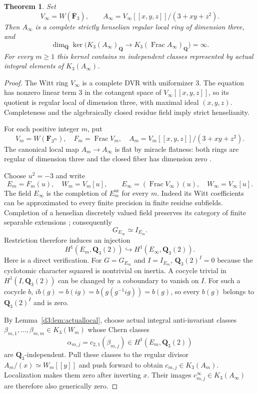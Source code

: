 \documentclass[11pt,a4paper]{amsart}
\numberwithin{equation}{section}
\newtheorem{theorem}{Theorem}[section]
\theoremstyle{definition}
\theoremstyle{remark}
\newcommand{\Q}{\mathbf Q}
\newcommand{\Frac}{\operatorname{Frac}}
\begin{document}
\begin{theorem}
\label{d3:thm:stricthenselianinfinite}
Set
\[
 V_\infty=W(\overline{\mathbf F}_3),\qquad
 A_\infty=V_\infty[[x,y,z]]/(3+xy+z^2).
\]
Then $A_\infty$ is a complete strictly henselian regular local ring of
dimension three, and
\[
 \dim_{\Q}\ker\bigl(
   K_3(A_\infty)_{\Q}
       \longrightarrow K_3(\Frac A_\infty)_{\Q}\bigr)=\infty.
\]
For every $m\geq1$ this kernel contains $m$ independent classes
represented by actual integral elements of $K_3(A_\infty)$.
\end{theorem}
\begin{proof}
The Witt ring $V_\infty$ is a complete DVR with uniformizer $3$.
The equation has nonzero linear term $3$ in the cotangent space of
$V_\infty[[x,y,z]]$, so its quotient is regular local of dimension three,
with maximal ideal $(x,y,z)$. Completeness and the algebraically closed
residue field imply strict henselianity.

For each positive integer $m$, put
\[
 V_m=W(\mathbf F_{3^m}),\quad F_m=\Frac V_m,\quad
 A_m=V_m[[x,y,z]]/(3+xy+z^2).
\]
The canonical local map $A_m\to A_\infty$ is flat by miracle flatness:
both rings are regular of dimension three and the closed fiber has
dimension zero \cite[Tag~00R4]{StacksFlatness}.

Choose $u^2=-3$ and write
\[
 E_m=F_m(u),\quad W_m=V_m[u],\qquad
 E_\infty=(\Frac V_\infty)(u),\quad W_\infty=V_\infty[u].
\]
The field $E_\infty$ is the completion of $E_m^{\mathrm{ur}}$ for every
$m$. Indeed its Witt coefficients can be approximated to every finite
precision in finite residue subfields. Completion of a henselian
discretely valued field preserves its category of finite separable
extensions \cite[Lemma~4.2.1]{SaitoCompletion}; consequently
\[
 G_{E_\infty}\simeq I_{E_m}.
\]
Restriction therefore induces an injection
\begin{equation}\label{d3:eq:inertiarestriction}
 H^1(E_m,\Q_3(2))\hookrightarrow H^1(E_\infty,\Q_3(2)).
\end{equation}
Here is a direct verification. For $G=G_{E_m}$ and $I=I_{E_m}$,
$\Q_3(2)^I=0$ because the cyclotomic character squared is nontrivial
on inertia. A cocycle trivial in $H^1(I,\Q_3(2))$ can be changed by a
coboundary to vanish on $I$. For such a cocycle $b$,
$i b(g)=b(ig)=b(g(g^{-1}ig))=b(g)$, so every $b(g)$ belongs to
$\Q_3(2)^I$ and is zero.

By Lemma~\ref{d3:lem:actuallocal}, choose actual integral
anti-invariant classes
$\beta_{m,1},\ldots,\beta_{m,m}\in K_3(W_m)$ whose Chern classes
\[
 \alpha_{m,j}=c_{2,1}(\beta_{m,j})
       \in H^1(E_m,\Q_3(2))
\]
are $\Q_3$-independent. Pull these classes to the regular divisor
$A_m/(x)\simeq W_m[[y]]$ and push forward to obtain
$c_{m,j}\in K_3(A_m)$. Localization makes them zero after inverting
$x$. Their images $c^\infty_{m,j}\in K_3(A_\infty)$ are therefore
also generically zero.


\end{proof}
\end{document}
